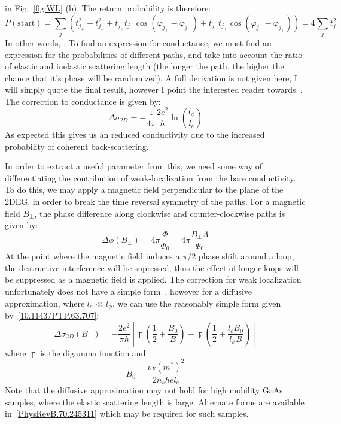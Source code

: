 in Fig.~\ref{fig:WL} (b). The return probability is therefore:
\begin{equation}
  P(\textrm{start}) = \sum_j \left(t_{j_+}^2 + t_{j_-}^2 + t_{j_+}t_{j_-}\cos(\varphi_{j_+} - \varphi_{j_-}) + t_{j_-}t_{j_+}\cos(\varphi_{j_-} - \varphi_{j_+})\right) = 4 \sum_jt_j^2
\end{equation}
In other words, . To find an expression for conductance, we must find an expression for the probabilities of different paths, and take
into account the ratio of elastic and inelastic scattering length (the longer the path, the higher the chance that it's phase will be randomized). A full derivation
is not given here, I will simply quote the final result, however I point the interested reader towards~\cite{delftbook,datta1997electronic}. The correction
to conductance is given by:
\begin{equation}
  \Delta \sigma_{2D} = -\frac{1}{4\pi}\frac{2e^2}{h}\ln\left(\frac{l_\phi}{l_e}\right)
\end{equation}
As expected this gives us an reduced conductivity due to the increased probability of coherent back-scattering.

In order to extract a useful parameter from this, we need some way of differentiating the contribution of weak-localization from
the bare conductivity. To do this, we may apply a magnetic field perpendicular to the plane of the 2DEG, in order to break the time
reversal symmetry of the paths. For a magnetic field $B_\perp$, the phase difference along clockwise and counter-clockwise paths
is given by:
\begin{equation}
  \Delta \phi(B_\perp) = 4 \pi \frac{\Phi}{\Phi_0} = 4\pi \frac{B_\perp A}{\Psi_0}
\end{equation}
At the point where the magnetic field induces a $\pi/2$ phase shift around a loop, the destructive interference will be supressed, thus the
effect of longer loops will be suppressed as a magnetic field is applied. The correction for weak localization unfortunately does not have
a simple form~\cite{PhysRevB.70.245311}, however for a diffusive approximation, where $l_e \ll l_\phi$, we can use the reasonably simple form
given by~\ref{10.1143/PTP.63.707}:
\begin{equation}
  \Delta \sigma_{2D}(B_\perp) = -\frac{2 e^2}{\pi h}\left[\digamma\left(\frac{1}{2} + \frac{B_0}{B}\right) - \digamma\left(\frac{1}{2} + \frac{l_e B_0}{l_\phi B}\right)\right]
\end{equation}
where $\digamma$ is the digamma function and
\begin{equation}
  B_0 = \frac{v_F (m^*)^2}{2 n_s h e l_e}
\end{equation}
Note that the diffusive approximation may not hold for high mobility GaAs samples, where the elastic scattering length is large.
Alternate forms are available in~\ref{PhysRevB.70.245311} which may be required for such samples.


